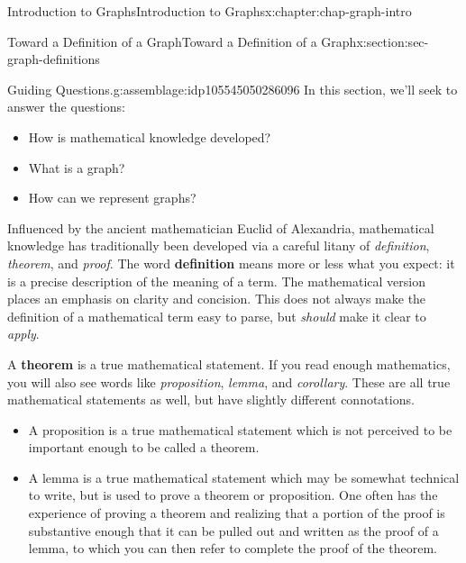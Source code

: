 \documentclass[oneside,10pt,]{book}
\newcommand{\terminology}[1]{\textbf{#1}}
\begin{document}
%
%
\typeout{************************************************}
\typeout{************************************************}
%
\begin{chapterptx}{Introduction to Graphs}{}{Introduction to Graphs}{}{}{x:chapter:chap-graph-intro}
%
%
\typeout{************************************************}
\typeout{************************************************}
%
\begin{sectionptx}{Toward a Definition of a Graph}{}{Toward a Definition of a Graph}{}{}{x:section:sec-graph-definitions}
\begin{assemblage}{Guiding Questions.}{g:assemblage:idp105545050286096}%
In this section, we'll seek to answer the questions: %
\begin{itemize}[label=\textbullet]
\item{}How is mathematical knowledge developed?%
\item{}What is a graph?%
\item{}How can we represent graphs?%
\end{itemize}
%
\end{assemblage}
\begin{introduction}{}%
Influenced by the ancient mathematician Euclid of Alexandria, mathematical knowledge has traditionally been developed via a careful litany of \emph{definition}, \emph{theorem}, and \emph{proof}. The word \terminology{definition} means more or less what you expect: it is a precise description of the meaning of a term. The mathematical version places an emphasis on clarity and concision. This does not always make the definition of a mathematical term easy to parse, but \emph{should} make it clear to \emph{apply}.%
\par
A \terminology{theorem} is a true mathematical statement. If you read enough mathematics, you will also see words like \emph{proposition}, \emph{lemma}, and \emph{corollary}. These are all true mathematical statements as well, but have slightly different connotations.%
\begin{itemize}[label=\textbullet]
\item{}A proposition is a true mathematical statement which is not perceived to be important enough to be called a theorem.%
\item{}A lemma is a true mathematical statement which may be somewhat technical to write, but is used to prove a theorem or proposition. One often has the experience of proving a theorem and realizing that a portion of the proof is substantive enough that it can be pulled out and written as the proof of a lemma, to which you can then refer to complete the proof of the theorem.%

\end{itemize}
\end{introduction}
\end{sectionptx}
\end{chapterptx}
\end{document}
